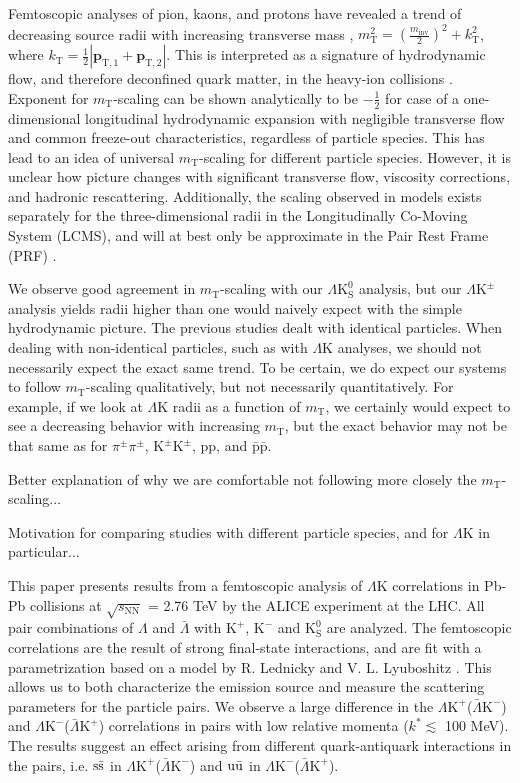 \documentclass[ALICE,manyauthors]{cernphprep}
\newcommand{\kstar}{$k^{*}$\xspace}
\newcommand{\mt}{$m_{\mathrm{T}}$\xspace}
\newcommand{\Lam}{$\Lambda$\xspace}
\newcommand{\ALam}{$\bar{\Lambda}$\xspace}
\newcommand{\KchP}{$\mathrm{K^{+}}$\xspace}
\newcommand{\KchM}{$\mathrm{K^{-}}$\xspace}
\newcommand{\Ks}{$\mathrm{K^{0}_{S}}$\xspace}
\newcommand{\LamK}{$\Lambda$K\xspace}
\newcommand{\LamKchPALamKchM}{$\Lambda\mathrm{K^{+}}$($\bar{\Lambda}\mathrm{K^{-}}$)\xspace}
\newcommand{\LamKchMALamKchP}{$\Lambda\mathrm{K^{-}}$($\bar{\Lambda}\mathrm{K^{+}}$)\xspace}
\newcommand{\LamKpm}{$\Lambda\mathrm{K^{\pm}}$\xspace}
\newcommand{\LamKs}{$\Lambda\mathrm{K^{0}_{S}}$\xspace}
\begin{document}
Femtoscopic analyses of pion, kaons, and protons have revealed a trend of decreasing source radii with increasing transverse mass \cite{Adam:2015vja}, $m_{\mathrm{T}}^{2} = (\frac{m_{\mathrm{inv}}}{2})^{2} + k_{\mathrm{T}}^{2}$, where $k_{\mathrm{T}} = \frac{1}{2}|\mathbf{p}_{\mathrm{T},1} + \mathbf{p}_{\mathrm{T},2}|$.  
This is interpreted as a signature of hydrodynamic flow, and therefore deconfined quark matter, in the heavy-ion collisions \cite{Akkelin:1995gh}. 
Exponent for \mt-scaling can be shown analytically to be $-\frac{1}{2}$ for case of a one-dimensional longitudinal hydrodynamic expansion with negligible transverse flow and common freeze-out characteristics, regardless of particle species.
This has lead to an idea of universal \mt-scaling for different particle species.
However, it is unclear how picture changes with significant transverse flow, viscosity corrections, and hadronic rescattering.
Additionally, the scaling observed in models exists separately for the three-dimensional radii in the Longitudinally Co-Moving System (LCMS), and will at best only be approximate in the Pair Rest Frame (PRF) \cite{Adam:2015vja, Kisiel:2014upa}.

We observe good agreement in \mt-scaling with our \LamKs analysis, but our \LamKpm analysis yields radii higher than one would naively expect with the simple hydrodynamic picture.  
The previous studies dealt with identical particles.
When dealing with non-identical particles, such as with \LamK analyses, we should not necessarily expect the exact same trend. 
To be certain, we do expect our systems to follow \mt-scaling qualitatively, but not necessarily quantitatively.
For example, if we look at \LamK radii as a function of \mt, we certainly would expect to see a decreasing behavior with increasing \mt, but the exact behavior may not be that same as for $\pi^{\pm}\pi^{\pm}$, $\mathrm{K}^{\pm}\mathrm{K}^{\pm}$, pp, and $\bar{\mathrm{p}}\bar{\mathrm{p}}$.

Better explanation of why we are comfortable not following more closely the \mt-scaling...

Motivation for comparing studies with different particle species, and for \LamK in particular...

This paper presents results from a femtoscopic analysis of \LamK correlations in Pb-Pb collisions at $\sqrt{s_{\mathrm{NN}}}$ = 2.76 TeV by the ALICE experiment at the LHC.  
All pair combinations of \Lam and \ALam with \KchP, \KchM and \Ks are analyzed. 
The femtoscopic correlations are the result of strong final-state interactions, and are fit with a parametrization based on a model by R. Lednicky and V. L. Lyuboshitz \cite{Lednicky:82}.  
This allows us to both characterize the emission source and measure the scattering parameters for the particle pairs.  
We observe a large difference in the \LamKchPALamKchM and \LamKchMALamKchP correlations in pairs with low relative momenta (\kstar $\lesssim$ 100 MeV).  
The results suggest an effect arising from different quark-antiquark interactions in the pairs, i.e. $\rm s\bar{s}$ in \LamKchPALamKchM and $\rm u\bar{u}$ in \LamKchMALamKchP.  
\end{document}

